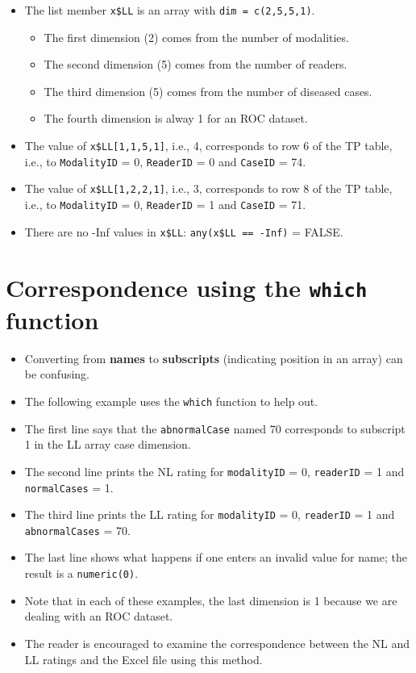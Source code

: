 \documentclass[]{book}
\providecommand{\tightlist}{%
  \setlength{\itemsep}{0pt}\setlength{\parskip}{0pt}}
\begin{document}
\begin{itemize}
\tightlist
\item
  The list member \texttt{x\$LL} is an array with \texttt{dim\ =\ c(2,5,5,1)}.

  \begin{itemize}
  \tightlist
  \item
    The first dimension (2) comes from the number of modalities.
  \item
    The second dimension (5) comes from the number of readers.
  \item
    The third dimension (5) comes from the number of diseased cases.
  \item
    The fourth dimension is alway 1 for an ROC dataset.
  \end{itemize}
\item
  The value of \texttt{x\$LL{[}1,1,5,1{]}}, i.e., 4, corresponds to row 6 of the TP table, i.e., to \texttt{ModalityID} = 0, \texttt{ReaderID} = 0 and \texttt{CaseID} = 74.
\item
  The value of \texttt{x\$LL{[}1,2,2,1{]}}, i.e., 3, corresponds to row 8 of the TP table, i.e., to \texttt{ModalityID} = 0, \texttt{ReaderID} = 1 and \texttt{CaseID} = 71.
\item
  There are no -Inf values in \texttt{x\$LL}: \texttt{any(x\$LL\ ==\ -Inf)} = FALSE.
\end{itemize}

\hypertarget{correspondence-using-the-which-function}{%
\section{\texorpdfstring{Correspondence using the \texttt{which} function}{Correspondence using the which function}}\label{correspondence-using-the-which-function}}

\begin{itemize}
\tightlist
\item
  Converting from \textbf{names} to \textbf{subscripts} (indicating position in an array) can be confusing.
\item
  The following example uses the \texttt{which} function to help out.
\item
  The first line says that the \texttt{abnormalCase} named 70 corresponds to subscript 1 in the LL array case dimension.
\item
  The second line prints the NL rating for \texttt{modalityID} = 0, \texttt{readerID} = 1 and \texttt{normalCases} = 1.
\item
  The third line prints the LL rating for \texttt{modalityID} = 0, \texttt{readerID} = 1 and \texttt{abnormalCases} = 70.
\item
  The last line shows what happens if one enters an invalid value for name; the result is a \texttt{numeric(0)}.
\item
  Note that in each of these examples, the last dimension is 1 because we are dealing with an ROC dataset.
\item
  The reader is encouraged to examine the correspondence between the NL and LL ratings and the Excel file using this method.
\end{itemize}
\end{document}
